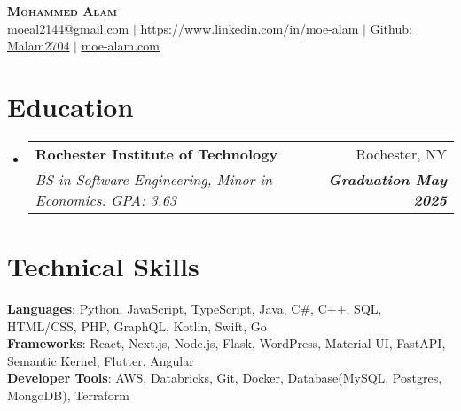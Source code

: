 \documentclass[letterpaper,11pt]{article}
\makeatletter
\newcommand{\resumeSubheading}[4]{
  \vspace{-2pt}\item
    \begin{tabular*}{0.97\textwidth}[t]{l@{\extracolsep{\fill}}r}
      \textbf{#1} & #2 \\
      \textit{\small#3} & \textit{\small #4} \\
    \end{tabular*}\vspace{-7pt}
}
\newcommand{\resumeSubHeadingListStart}{\begin{itemize}[leftmargin=0.15in, label={}]}
\newcommand{\resumeSubHeadingListEnd}{\end{itemize}}
\makeatother
\begin{document}

\begin{center}
    \textbf{\Huge \scshape Mohammed Alam} \\ \vspace{1pt}
     \small \href{moeal2144@gmail.com}{\underline{moeal2144@gmail.com}} $|$ 
    \href{https://www.linkedin.com/in/moe-alam/}{{https://www.linkedin.com/in/moe-alam}} $|$
    \href{https://github.com/Malam2704}{\underline{Github: Malam2704}} $|$
    \href{https://moe-alam.com}{\underline{moe-alam.com}}
    
\end{center}


\section{Education}
  \resumeSubHeadingListStart
    \resumeSubheading
     {Rochester Institute of Technology}{Rochester, NY}
      {BS in Software Engineering, Minor in Economics. GPA: 3.63}{\textbf{Graduation May 2025}}
  \resumeSubHeadingListEnd

%
\section{Technical Skills}
 \begin{itemize}[leftmargin=0.15in, label={}]
    \small{\item{
     \textbf{Languages}{: Python, JavaScript, TypeScript, Java, C\#, C++, SQL, HTML/CSS, PHP, GraphQL, Kotlin, Swift, Go } \\
     \textbf{Frameworks}{: React, Next.js, Node.js, Flask, WordPress, Material-UI, FastAPI, Semantic Kernel, Flutter, Angular} \\
     \textbf{Developer Tools}{: AWS, Databricks, Git, Docker, Database(MySQL, Postgres, MongoDB),  Terraform}
    }}
 \end{itemize}
\end{document}
